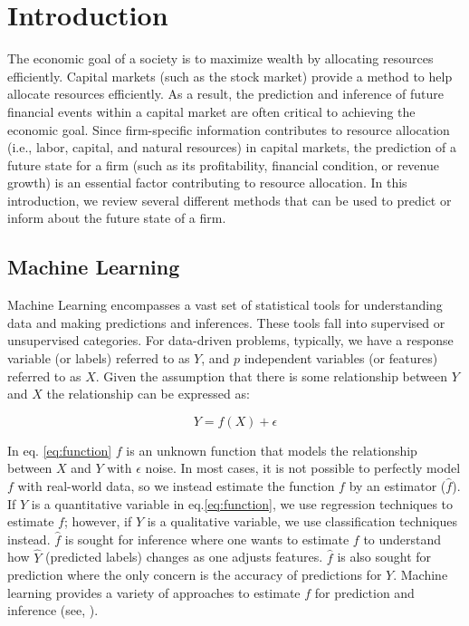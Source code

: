 \chapter{Introduction}


The economic goal of a society is to maximize wealth by allocating resources efficiently. Capital markets (such as the stock market) provide a method to help allocate resources efficiently. As a result, the prediction and inference of future financial events within a capital market are often critical to achieving the economic goal. Since firm-specific information contributes to resource allocation (i.e., labor, capital, and natural resources) in capital markets, the prediction of a future state for a firm (such as its profitability, financial condition, or revenue growth) is an essential factor contributing to resource allocation.  In this introduction, we review several different methods that can be used to predict or inform about the future state of a firm.  


\section{Machine Learning}

Machine Learning encompasses a vast set of statistical tools for understanding data and making predictions and inferences. These tools fall into supervised or unsupervised categories. For data-driven problems, typically, we have a response variable (or labels)  referred to as \(Y\), and \(p\) independent variables (or features) referred to as \(X\). Given the assumption that there is some relationship between \(Y\) and \(X\) the relationship can be expressed as:

\begin{equation}
\label{eq:function}
Y = f(X) + \epsilon
\end{equation}

\noindent In eq. \ref{eq:function} \(f\) is an unknown function that models the relationship between \(X\) and \(Y\) with  \( \epsilon \) noise.  In most cases, it is not possible to perfectly model \(f\) with real-world data, so we instead estimate the function \(f\) by an estimator (\(\hat{f}\)). If \(Y\) is a quantitative variable in eq.\ref{eq:function}, we use regression techniques to estimate \(f\); however, if \(Y\) is a qualitative variable, we use classification techniques instead.   \(\hat{f}\) is sought for inference where one wants to estimate \(f\) to understand how \(\hat{Y}\) (predicted labels) changes as one adjusts features. \(\hat{f}\) is also sought for prediction where the only concern is the accuracy of predictions for \(Y\). Machine learning provides a variety of approaches to estimate \(f\) for prediction and inference (see, \eg \cite{ISL}).

